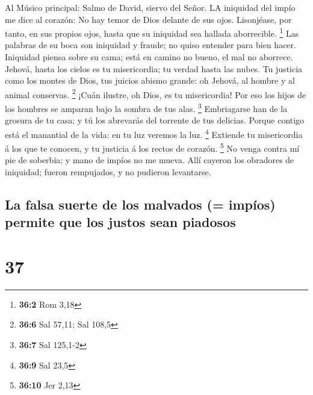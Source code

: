  Al Músico principal: Salmo de David, siervo del Señor. LA
iniquidad del impío me dice al corazón: No hay temor de Dios delante de
sus ojos.  Lisonjéase, por tanto, en sus propios ojos, hasta
que su iniquidad sea hallada aborrecible. \footnote{\textbf{36:2} Rom
  3,18}  Las palabras de su boca son iniquidad y fraude; no
quiso entender para bien hacer.  Iniquidad piensa sobre su
cama; está en camino no bueno, el mal no aborrece.  Jehová,
hasta los cielos es tu misericordia; tu verdad hasta las nubes.
 Tu justicia como los montes de Dios, tus juicios abismo
grande: oh Jehová, al hombre y al animal conservas. \footnote{\textbf{36:6}
  Sal 57,11; Sal 108,5}  ¡Cuán ilustre, oh Dios, es tu
misericordia! Por eso los hijos de los hombres se amparan bajo la sombra
de tus alas. \footnote{\textbf{36:7} Sal 125,1-2} 
Embriagarse han de la grosura de tu casa; y tú los abrevarás del
torrente de tus delicias.  Porque contigo está el manantial
de la vida: en tu luz veremos la luz. \footnote{\textbf{36:9} Sal 23,5}
 Extiende tu misericordia á los que te conocen, y tu
justicia á los rectos de corazón. \footnote{\textbf{36:10} Jer 2,13}
 No venga contra mí pie de soberbia; y mano de impíos no me
mueva.  Allí cayeron los obradores de iniquidad; fueron
rempujados, y no pudieron levantarse.

\hypertarget{la-falsa-suerte-de-los-malvados-impuxedos-permite-que-los-justos-sean-piadosos}{%
\subsection{La falsa suerte de los malvados (= impíos) permite que los
justos sean
piadosos}\label{la-falsa-suerte-de-los-malvados-impuxedos-permite-que-los-justos-sean-piadosos}}

\hypertarget{section-36}{%
\section{37}\label{section-36}}

